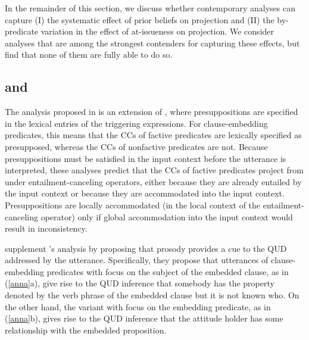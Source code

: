 \documentclass[11pt,fleqn]{article}
\newcommand{\6}{\mbox{$[\hspace*{-.6mm}[$}}
\newcommand{\9}{\mbox{$]\hspace*{-.6mm}]$}}
\newcommand{\citepos}[1]{\citeauthor{#1}'s \citeyear{#1}}
\begin{document}
In the remainder of this section, we discuss whether contemporary analyses can capture (I) the systematic effect of prior beliefs on projection and (II) the by-predicate variation in the effect of at-issueness on projection. We consider analyses that are among the strongest contenders for capturing these effects, but find that none of them are fully able to do so.

\subsection{\citealt{heim83} and \citealt{djaerv-bacovcin2020}}\label{s41}

The analysis proposed in \citealt{djaerv-bacovcin2020} is an extension of \citealt{heim83}, where presuppositions are specified in the lexical entries of the triggering expressions. For clause-embedding predicates, this means that the CCs of factive predicates are lexically specified as presupposed, whereas the CCs of nonfactive predicates are not. Because presuppositions must be satisfied in the input context before the utterance is interpreted, these analyses predict that the CCs of factive predicates project from under entailment-canceling operators, either because they are already entailed by the input context or because they are accommodated into the input context. Presuppositions are locally accommodated (in the local context of the entailment-canceling operator) only if global accommodation into the input context would result in inconsistency.

\citealt{djaerv-bacovcin2020} supplement \citepos{heim83} analysis by proposing that prosody provides a cue to the QUD addressed by the utterance. Specifically, they propose that utterances of clause-embedding predicates with focus on the subject of the embedded clause, as in (\ref{anna}a), give rise to the QUD inference that somebody has the property denoted by the verb phrase of the embedded clause but it is not known who. On the other hand, the variant with focus on the embedding predicate, as in (\ref{anna}b), gives rise to the QUD inference that the attitude holder has some relationship with the embedded proposition.
\end{document}
